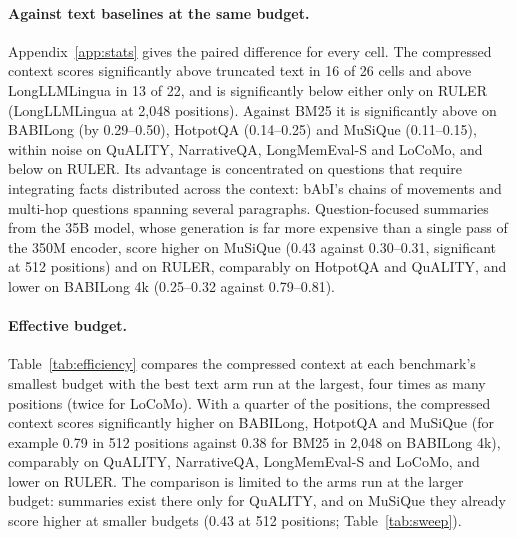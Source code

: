 \documentclass[11pt]{article}
\begin{document}
\paragraph{Against text baselines at the same budget.}
Appendix~\ref{app:stats} gives the paired difference for every cell. The compressed context scores
significantly above truncated text in 16 of 26 cells and above LongLLMLingua in 13 of 22, and is
significantly below either only on RULER (LongLLMLingua at 2{,}048 positions). Against BM25 it is
significantly above on BABILong (by 0.29--0.50), HotpotQA (0.14--0.25) and MuSiQue (0.11--0.15),
within noise on QuALITY, NarrativeQA, LongMemEval-S and LoCoMo, and below on RULER. Its
advantage is concentrated on questions that require integrating facts distributed across the
context: bAbI's chains of movements and multi-hop questions spanning several paragraphs.
Question-focused summaries from the 35B model, whose generation is far more expensive than a single
pass of the 350M encoder, score higher on MuSiQue (0.43 against 0.30--0.31, significant at 512
positions) and on RULER, comparably on HotpotQA and QuALITY, and lower on BABILong 4k (0.25--0.32 against 0.79--0.81).

\paragraph{Effective budget.}
Table~\ref{tab:efficiency} compares the compressed context at each benchmark's smallest budget with
the best text arm run at the largest, four times as many positions (twice for LoCoMo). With a quarter
of the positions, the compressed context scores significantly higher on BABILong, HotpotQA and
MuSiQue (for example 0.79 in 512 positions against 0.38 for BM25 in 2{,}048 on BABILong 4k),
comparably on QuALITY, NarrativeQA, LongMemEval-S and LoCoMo, and lower on RULER. The comparison is
limited to the arms run at the larger budget: summaries exist there only for QuALITY, and on MuSiQue
they already score higher at smaller budgets (0.43 at 512 positions; Table~\ref{tab:sweep}).

\begin{table}[!ht]
\centering
\small
\resizebox{\linewidth}{!}{}
\caption{The compressed context at a benchmark's smallest budget against the best text-only arm run
at the largest budget (truncated text under either decoder, BM25, LongLLMLingua, or a summary where one was generated at
that budget, each with its better decoder). Positions: how many times more decoder positions the text arm has. Difference:
mean paired difference with 95\% bootstrap interval; bold where it excludes zero.}
\label{tab:efficiency}
\end{table}
\end{document}
